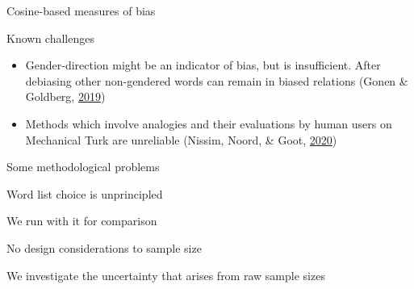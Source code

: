 \documentclass[10pt,ignorenonframetext,x11names, dvipsnames, bibspacing,natbib]{beamer}
\begin{document}
\begin{frame}{Cosine-based measures of bias}

\begin{block}{Known challenges}

\begin{itemize}
\item
  Gender-direction might be an indicator of bias, but is insufficient.
  After debiasing other non-gendered words can remain in biased
  relations (Gonen \& Goldberg,
  \protect\hyperlink{ref-Gonen2019lipstick}{2019})
\item
  Methods which involve analogies and their evaluations by human users
  on Mechanical Turk are unreliable (Nissim, Noord, \& Goot,
  \protect\hyperlink{ref-Nissim2020fair}{2020})
\end{itemize}

\end{block}

\end{frame}

\begin{frame}{Some methodological problems}

\begin{block}{Word list choice is unprincipled}

We run with it for comparison

\pause

\end{block}

\begin{block}{No design considerations to sample size}

We investigate the uncertainty that arises from raw sample sizes

\end{block}

\end{frame}
\end{document}
